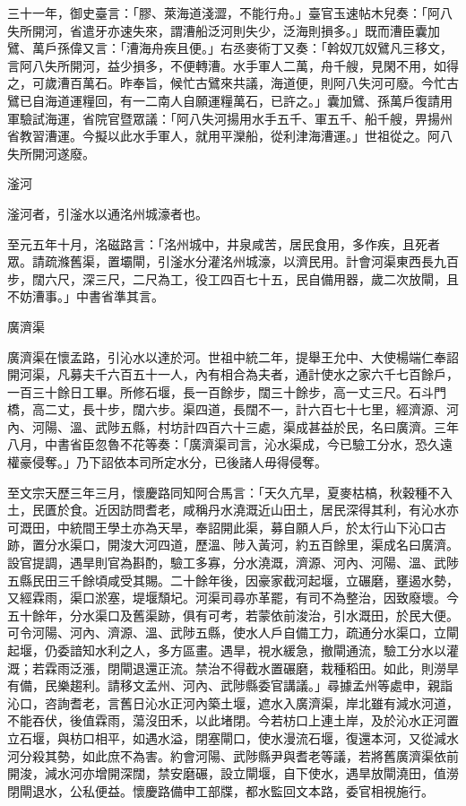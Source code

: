 \begin{pinyinscope}
 三十一年，御史臺言：「膠、萊海道淺澀，不能行舟。」臺官玉速帖木兒奏：「阿八失所開河，省遣牙亦速失來，謂漕船泛河則失少，泛海則損多。」既而漕臣囊加鷿、萬戶孫偉又言：「漕海舟疾且便。」右丞麥術丁又奏：「斡奴兀奴鷿凡三移文，言阿八失所開河，益少損多，不便轉漕。水手軍人二萬，舟千艘，見閑不用，如得之，可歲漕百萬石。昨奉旨，候忙古鷿來共議，海道便，則阿八失河可廢。今忙古鷿已自海道運糧回，有一二南人自願運糧萬石，已許之。」囊加鷿、孫萬戶復請用軍驗試海運，省院官暨眾議：「阿八失河揚用水手五千、軍五千、船千艘，畀揚州省教習漕運。今擬以此水手軍人，就用平灤船，從利津海漕運。」世祖從之。阿八失所開河遂廢。



 滏河



 滏河者，引滏水以通洺州城濠者也。



 至元五年十月，洺磁路言：「洺州城中，井泉咸苦，居民食用，多作疾，且死者眾。請疏滌舊渠，置壩閘，引滏水分灌洺州城濠，以濟民用。計會河渠東西長九百步，闊六尺，深三尺，二尺為工，役工四百七十五，民自備用器，歲二次放閘，且不妨漕事。」中書省準其言。



 廣濟渠



 廣濟渠在懷孟路，引沁水以達於河。世祖中統二年，提舉王允中、大使楊端仁奉詔開河渠，凡募夫千六百五十一人，內有相合為夫者，通計使水之家六千七百餘戶，一百三十餘日工畢。所修石堰，長一百餘步，闊三十餘步，高一丈三尺。石斗門橋，高二丈，長十步，闊六步。渠四道，長闊不一，計六百七十七里，經濟源、河內、河陽、溫、武陟五縣，村坊計四百六十三處，渠成甚益於民，名曰廣濟。三年八月，中書省臣忽魯不花等奏：「廣濟渠司言，沁水渠成，今已驗工分水，恐久遠權豪侵奪。」乃下詔依本司所定水分，已後諸人毋得侵奪。



 至文宗天歷三年三月，懷慶路同知阿合馬言：「天久亢旱，夏麥枯槁，秋穀種不入土，民匱於食。近因訪問耆老，咸稱丹水澆溉近山田土，居民深得其利，有沁水亦可溉田，中統間王學土亦為天旱，奉詔開此渠，募自願人戶，於太行山下沁口古跡，置分水渠口，開浚大河四道，歷溫、陟入黃河，約五百餘里，渠成名曰廣濟。設官提調，遇旱則官為斟酌，驗工多寡，分水澆溉，濟源、河內、河陽、溫、武陟五縣民田三千餘頃咸受其賜。二十餘年後，因豪家截河起堰，立碾磨，壅遏水勢，又經霖雨，渠口淤塞，堤堰頹圮。河渠司尋亦革罷，有司不為整治，因致廢壞。今五十餘年，分水渠口及舊渠跡，俱有可考，若蒙依前浚治，引水溉田，於民大便。可令河陽、河內、濟源、溫、武陟五縣，使水人戶自備工力，疏通分水渠口，立閘起堰，仍委諳知水利之人，多方區畫。遇旱，視水緩急，撤閘通流，驗工分水以灌溉；若霖雨泛漲，閉閘退還正流。禁治不得截水置碾磨，栽種稻田。如此，則澇旱有備，民樂趨利。請移文孟州、河內、武陟縣委官講議。」尋據孟州等處申，親詣沁口，咨詢耆老，言舊日沁水正河內築土堰，遮水入廣濟渠，岸北雖有減水河道，不能吞伏，後值霖雨，蕩沒田禾，以此堵閉。今若枋口上連土岸，及於沁水正河置立石堰，與枋口相平，如遇水溢，閉塞閘口，使水漫流石堰，復還本河，又從減水河分殺其勢，如此庶不為害。約會河陽、武陟縣尹與耆老等議，若將舊廣濟渠依前開浚，減水河亦增開深闊，禁安磨碾，設立閘堰，自下使水，遇旱放閘澆田，值澇閉閘退水，公私便益。懷慶路備申工部牒，都水監回文本路，委官相視施行。




\end{pinyinscope}

